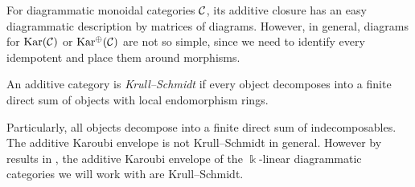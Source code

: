 For diagrammatic monoidal categories $\mathcal{C}$, its additive closure has an easy diagrammatic description by matrices of diagrams. However, in general, diagrams for $\operatorname{Kar}(\mathcal{C})$ or $\operatorname{Kar^\oplus}(\mathcal{C})$ are not so simple, since we need to identify every idempotent and place them around morphisms.

\begin{definition}
    An additive category is \textit{Krull--Schmidt} if every object decomposes into a finite direct sum of objects with local endomorphism rings.
\end{definition}

Particularly, all objects decompose into a finite direct sum of indecomposables. The additive Karoubi envelope is not Krull--Schmidt in general. However by results in \cite[Secition 11.3 Appendix 1]{intro-soergel-bimodules}, the additive Karoubi envelope of the $\Bbbk$-linear diagrammatic categories we will work with are Krull--Schmidt.

